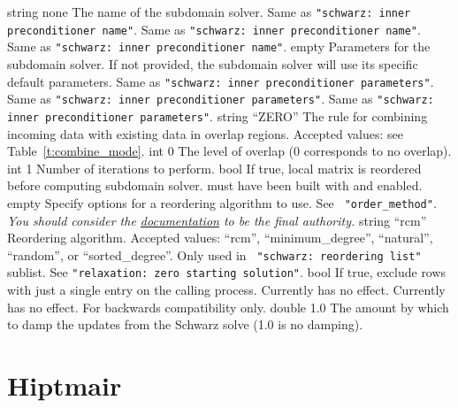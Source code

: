     {string}
    {none}
    {The name of the subdomain solver.}
    {Same as {\tt "schwarz: inner preconditioner name"}.}
    {Same as {\tt "schwarz: inner preconditioner name"}.}
    {Same as {\tt "schwarz: inner preconditioner name"}.}
    {\parameterlist}
    {empty}
    {Parameters for the subdomain solver. If not provided, the subdomain solver
     will use its specific default parameters.}
    {Same as {\tt "schwarz: inner preconditioner parameters"}.}
    {Same as {\tt "schwarz: inner preconditioner parameters"}.}
    {Same as {\tt "schwarz: inner preconditioner parameters"}.}
    {string}
    {``ZERO''}
    {The rule for combining incoming data with existing data in overlap regions.
     Accepted values: see Table~\ref{t:combine_mode}.}
    {int}
    {0}
    {The level of overlap (0 corresponds to no overlap).}
    {int}
    {1}
    {Number of iterations to perform.}
    {bool}
    {\false}
    {If true, local matrix is reordered before computing subdomain solver. \trilinos must have been built with
     \zoltantwo and \xpetra enabled.}
    {\parameterlist}
    {empty}
    {Specify options for a \zoltantwo reordering algorithm to use. See {\tt
     "order\_method"}. {\em You should consider the
     \href{http://trilinos.org/docs/dev/packages/zoltan2/doc/html/z2_parameters.html}{\zoltantwo
     documentation} to be the final authority.}}
    {string}
    {``rcm''}
    {Reordering algorithm. Accepted values: ``rcm'', ``minimum\_degree'',
     ``natural'', ``random'', or ``sorted\_degree''. Only used in {\tt
     "schwarz: reordering list"} sublist.}
    {See {\tt "relaxation: zero starting solution"}.}
    {bool}
    {\false}
    {If true, exclude rows with just a single entry on the calling process.}
    {Currently has no effect.}
    {Currently has no effect. For backwards compatibility only.}
    {double}
    {1.0}
    {The amount by which to damp the updates from the Schwarz solve
      (1.0 is no damping).}
\section{Hiptmair}

